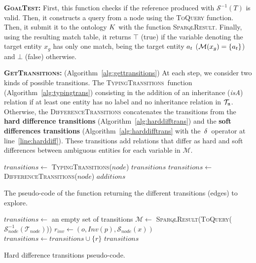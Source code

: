 \documentclass[a4paper,11pt,twoside]{StyleThese}
\begin{document}
\textbf{\textsc{GoalTest}:}
First, this function checks if the reference produced with $\mathcal{S}^{-1}(T)$ is valid. Then, it constructs a \sparql{} query from a node using the \textsc{ToQuery} function. Then, it submit it to the ontology $K$ with the function \textsc{SparqlResult}. Finally, using the resulting match table, it returns $\top$ (true) if the variable denoting the target entity $x_g$ has only one match, being the target entity $a_t$ ($\mathcal{M}(x_g) = \{a_t\}$) and $\bot$ (false) otherwise.

\textbf{\textsc{GetTransitions}:}
(Algorithm~\ref{alg:gettransitions}) At each step, we consider two kinds of possible transitions. The \textsc{TypingTransitions}~function (Algorithm~\ref{alg:typingtrans}) consisting in the addition of an inheritance (\textit{isA}) relation if at least one entity has no label and no inheritance relation in $\mathcal{T}_{\mathfrak{n}}$. Otherwise, the \textsc{DifferenceTransitions} concatenates the transitions from the \textbf{hard difference transitions} (Algorithm~\ref{alg:harddifftrans}) and the \textbf{soft differences transitions} (Algorithm~\ref{alg:harddifftrans} with the $\,\delta\,$ operator at line~\ref{line:harddiff}). These transitions add relations that differ as hard and soft differences between ambiguous entities for each variable in $\mathcal{M}$.

\begin{algorithm}[htpb]
\begin{algorithmic}[1]
\State $transitions\leftarrow$ \textsc{TypingTransitions}($node$)
	\State \Return $transitions$
\EndIf
\State $transitions\leftarrow$ \textsc{DifferenceTransitions}($node$)
\State \Return $additions$
\EndFunction
\end{algorithmic}
 \caption{The pseudo-code of the function returning the different transitions (edges) to explore.}
 \label{alg:gettransitions}
\end{algorithm}

\begin{algorithm}[htb]
\begin{algorithmic}[1]
\State $transitions\leftarrow$ an empty set of transitions
\State $\mathcal{M}\leftarrow$ \textsc{SparqlResult}(\textsc{ToQuery}($\mathcal{S}_{node}^{-1}(\mathcal{T}_{node})$))
			 \label{line:harddiff}
				\State $r_{inv} \leftarrow (o, Inv(p), \mathcal{S}_{node}(x))$
					\State $transitions \leftarrow transitions \cup \{r\}$
				\EndIf
			\EndFor
		\EndIf
	\EndFor
\EndFor
\State \Return $transitions$
\EndFunction
\end{algorithmic}
 \caption{Hard difference transitions pseudo-code.}
 \label{alg:harddifftrans}
\end{algorithm}
\end{document}
